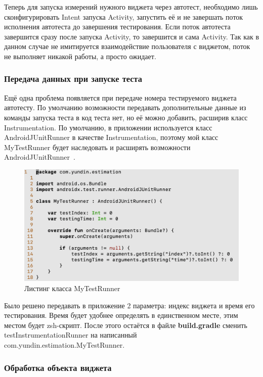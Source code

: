 \documentclass[a4paper,14pt]{extarticle} %
\begin{document}
	Теперь для запуска измерений нужного виджета через автотест, необходимо лишь сконфигурировать Intent запуска Activity, запустить её и не завершать поток исполнения автотеста до завершения тестирования. Если поток автотеста завершится сразу после запуска Activity, то завершится и сама Activity. Так как в данном случае не имитируется взаимодействие пользователя с виджетом, поток не выполняет никакой работы, а просто ожидает.
	
	\subsubsection{Передача данных при запуске теста}
	
	Ещё одна проблема появляется при передаче номера тестируемого виджета автотесту. По умолчанию возможности передавать дополнительные данные из команды запуска теста в код теста нет, но её можно добавить, расширив класс Instrumentation. По умолчанию, в приложении используется класс AndroidJUnitRunner в качестве Instrumentation, поэтому мой класс MyTestRunner будет наследовать и расширять возможности AndroidJUnitRunner~\ris{\ref{fig:mytestrunner}}.
	
	\begin{figure}[tbh]
		\includegraphics[width=\textwidth]{mytestrunner}
		\caption{Листинг класса MyTestRunner}
		\label{fig:mytestrunner}
	\end{figure}
	
	Было решено передавать в приложение 2 параметра: индекс виджета и время его тестирования. Время будет удобнее определять в единственном месте, этим местом будет zsh-скрипт. После этого остаётся в файле \textbf{build.gradle} сменить testInstrumentationRunner на написанный com.yundin.estimation.MyTestRunner.
	
	\subsubsection{Обработка объекта виджета}
	
\end{document}
